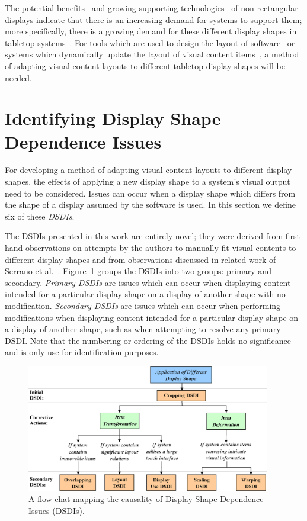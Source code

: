 \documentclass[twocolumn,compsoc]{cvm}
\begin{document}
The potential benefits~\cite{Greenfield2006,Vernier2002} and growing supporting technologies~\cite{Boyd2007,Finney2009} of non-rectangular displays indicate that there is an increasing demand for systems to support them; more specifically, there is a growing demand for these different display shapes in tabletop systems~\cite{Hansen2009,Shen2004}.
For tools which are used to design the layout of software~\cite{Meskens2008} or systems which dynamically update the layout of visual content items~\cite{Gajos2004}, a method of adapting visual content layouts to different tabletop display shapes will be needed.

\section{Identifying Display Shape Dependence Issues}
\label{sec:problem}

For developing a method of adapting visual content layouts to different display shapes, the effects of applying a new display shape to a system's visual output need to be considered.
Issues can occur when a display shape which differs from the shape of a display assumed by the software is used.
In this section we define six of these {\emph{\acp{DSDI}}}.

The \acp{DSDI} presented in this work are entirely novel; they were derived from first-hand observations on attempts by the authors to manually fit visual contents to different display shapes and from observations discussed in related work of Serrano et al.~\cite{Serrano2016,Serrano2017}.
Figure~\ref{fig:dsdiFlow} groups the \acp{DSDI} into two groups: primary and secondary.
{\emph{Primary \acp{DSDI}}} are issues which can occur when displaying content intended for a particular display shape on a display of another shape with no modification.
{\emph{Secondary \acp{DSDI}}} are issues which can occur when performing modifications when displaying content intended for a particular display shape on a display of another shape, such as when attempting to resolve any primary \ac{DSDI}.
Note that the numbering or ordering of the \acp{DSDI} holds no significance and is only use for identification purposes.

\begin{figure}[h!]
 \centering
   \includegraphics[width=0.95\textwidth]{figures/DSDIFlowChart.jpeg}
   \caption{A flow chat mapping the causality of Display Shape Dependence Issues (DSDIs).}
   \label{fig:dsdiFlow}
\end{figure}
\end{document}
